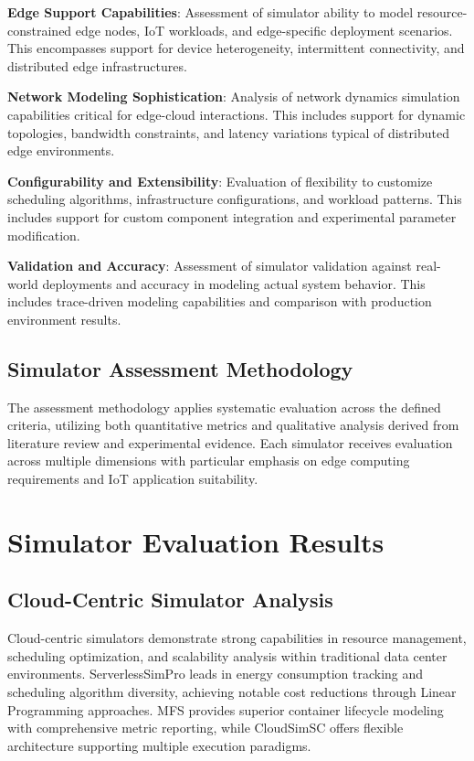 \textbf{Edge Support Capabilities}: Assessment of simulator ability to model resource-constrained edge nodes, IoT workloads, and edge-specific deployment scenarios. This encompasses support for device heterogeneity, intermittent connectivity, and distributed edge infrastructures.

\textbf{Network Modeling Sophistication}: Analysis of network dynamics simulation capabilities critical for edge-cloud interactions. This includes support for dynamic topologies, bandwidth constraints, and latency variations typical of distributed edge environments.

\textbf{Configurability and Extensibility}: Evaluation of flexibility to customize scheduling algorithms, infrastructure configurations, and workload patterns. This includes support for custom component integration and experimental parameter modification.

\textbf{Validation and Accuracy}: Assessment of simulator validation against real-world deployments and accuracy in modeling actual system behavior. This includes trace-driven modeling capabilities and comparison with production environment results.

\subsection{Simulator Assessment Methodology}

The assessment methodology applies systematic evaluation across the defined criteria, utilizing both quantitative metrics and qualitative analysis derived from literature review and experimental evidence. Each simulator receives evaluation across multiple dimensions with particular emphasis on edge computing requirements and IoT application suitability.

\section{Simulator Evaluation Results}

\subsection{Cloud-Centric Simulator Analysis}

Cloud-centric simulators demonstrate strong capabilities in resource management, scheduling optimization, and scalability analysis within traditional data center environments. ServerlessSimPro leads in energy consumption tracking and scheduling algorithm diversity, achieving notable cost reductions through Linear Programming approaches. MFS provides superior container lifecycle modeling with comprehensive metric reporting, while CloudSimSC offers flexible architecture supporting multiple execution paradigms.

